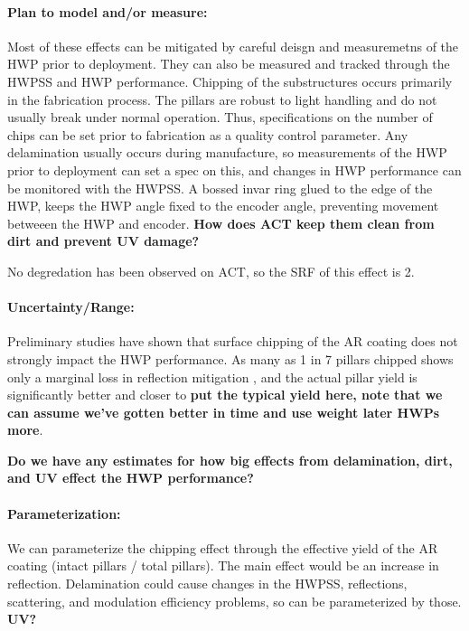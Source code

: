 \paragraph{Plan to model and/or measure:}
Most of these effects can be mitigated by careful deisgn and measuremetns of the HWP prior to deployment. They can also be measured and tracked through the HWPSS and HWP performance. Chipping of the substructures occurs primarily in the fabrication process. The pillars are robust to light handling and do not usually break under normal operation. Thus, specifications on the number of chips can be set prior to fabrication as a quality control parameter. Any delamination usually occurs during manufacture, so measurements of the HWP prior to deployment can set a spec on this, and changes in HWP performance can be monitored with the HWPSS. A bossed invar ring glued to the edge of the HWP, keeps the HWP angle fixed to the encoder angle, preventing movement betweeen the HWP and encoder. \textbf{How does ACT keep them clean from dirt and prevent UV damage?}

No degredation has been observed on ACT, so the SRF of this effect is 2.


\paragraph{Uncertainty/Range:}


Preliminary studies have shown that surface chipping of the AR coating does not strongly impact the HWP performance. As many as 1 in 7 pillars chipped shows only a marginal loss in reflection mitigation \cite{SiAR_1}, and the actual pillar yield is significantly better and closer to \textbf{put the typical yield here, note that we can assume we've gotten better in time and use weight later HWPs more}.

\textbf{Do we have any estimates for how big effects from delamination, dirt, and UV effect the HWP performance?}


\paragraph{Parameterization:}
We can parameterize the chipping effect through the effective yield of the AR coating (intact pillars / total pillars). The main effect would be an increase in reflection. Delamination could cause changes in the HWPSS, reflections, scattering, and modulation efficiency problems, so can be parameterized by those. \textbf{UV?}

